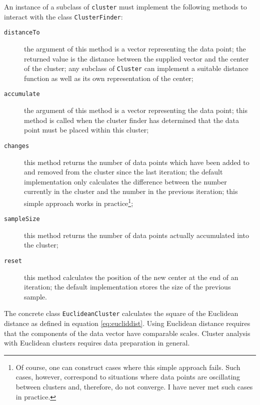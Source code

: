 \documentclass[twoside]{book}
\begin{document}
An instance of a subclass of {\tt cluster} must implement the
following methods to interact with the class {\tt ClusterFinder}:
\begin{description}
  \item[\tt distanceTo] the argument of this method is a vector
  representing the data point; the returned value is the distance
  between the supplied vector and the center of the cluster; any
  subclass of {\tt Cluster} can implement a suitable distance function
  as well as its own representation of the center;
  \item[\tt accumulate] the argument of this method is a vector
  representing the data point; this method is called when the
  cluster finder has determined that the data point must be placed
  within this cluster;
  \item[\tt changes] this method returns the number of data points
  which have been added to and removed from the cluster since the
  last iteration; the default implementation only calculates the
  difference between the number currently in the cluster and the
  number in the previous iteration; this simple approach works in
  practice\footnote{Of course, one can construct cases where this
  simple approach fails. Such cases, however, correspond to
  situations where data points are oscillating between clusters
  and, therefore, do not converge. I have never met such cases in practice.};
  \item[\tt sampleSize] this method returns the number of data
  points actually accumulated into the cluster;
  \item[\tt reset] this method calculates the position of the new
  center at the end of an iteration; the default implementation
  stores the size of the previous sample.
\end{description}


The concrete class {\tt EuclideanCluster} calculates the square of
the Euclidean distance as defined in equation \ref{eq:eucliddist}.
Using Euclidean distance requires that the components of the data
vector have comparable scales. Cluster analysis with Euclidean
clusters requires data preparation in general.
\end{document}
